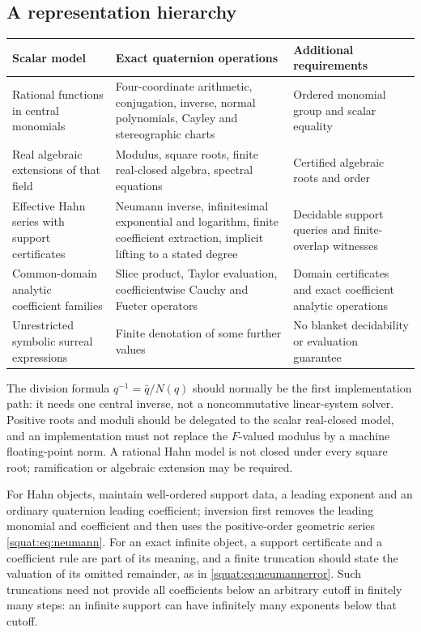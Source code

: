 \documentclass[11pt,letterpaper]{article}
\numberwithin{equation}{section}
\theoremstyle{definition}
\theoremstyle{remark}
\begin{document}
\subsection{A representation hierarchy}\label{squat:sub:hierarchy}

\begin{center}\small
\begin{tabular}{L{0.22\textwidth}L{0.34\textwidth}L{0.34\textwidth}}
\toprule
Scalar model & Exact quaternion operations & Additional requirements\\
\midrule
Rational functions in central monomials & Four-coordinate arithmetic, conjugation,
inverse, normal polynomials, Cayley and stereographic charts & Ordered monomial group and
scalar equality\\
Real algebraic extensions of that field & Modulus, square roots, finite real-closed
algebra, spectral equations & Certified algebraic roots and order\\
Effective Hahn series with support certificates & Neumann inverse, infinitesimal
exponential and logarithm, finite coefficient extraction, implicit lifting to a stated
degree & Decidable support queries and finite-overlap witnesses\\
Common-domain analytic coefficient families & Slice product, Taylor evaluation,
coefficientwise Cauchy and Fueter operators & Domain certificates and exact coefficient
analytic operations\\
Unrestricted symbolic surreal expressions & Finite denotation of some further values & No
blanket decidability or evaluation guarantee\\
\bottomrule
\end{tabular}
\end{center}

The division formula $q^{-1}=\bar q/N(q)$ should normally be the first implementation
path: it needs one central inverse, not a noncommutative linear-system solver. Positive
roots and moduli should be delegated to the scalar real-closed model, and an
implementation must not replace the $F$-valued modulus by a machine floating-point norm. A
rational Hahn model is not closed under every square root; ramification or algebraic
extension may be required.

For Hahn objects, maintain well-ordered support data, a leading exponent and an ordinary
quaternion leading coefficient; inversion first removes the leading monomial and
coefficient and then uses the positive-order geometric series
\cref{squat:eq:neumann}. For an exact infinite object, a support certificate and a
coefficient rule are part of its meaning, and a finite truncation should state the
valuation of its omitted remainder, as in \cref{squat:eq:neumannerror}. Such truncations
need not provide all coefficients below an arbitrary cutoff in finitely many steps: an
infinite support can have infinitely many exponents below that cutoff.
\end{document}
